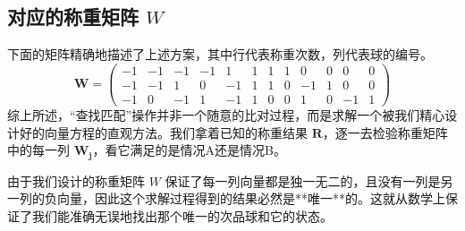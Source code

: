 \documentclass[12pt, a4paper]{ctexart}
\begin{document}
\subsection*{对应的称重矩阵 $W$}
下面的矩阵精确地描述了上述方案，其中行代表称重次数，列代表球的编号。
$$
\mathbf{W} =
\begin{pmatrix}
   -1 & -1 & -1 & -1 &  1 &  1 &  1 &  1 &  0 &  0 &  0 &  0 \\ %
   -1 & -1 &  1 &  0 & -1 &  1 &  1 &  0 & -1 &  1 &  0 &  0 \\ %
   -1 &  0 & -1 &  1 & -1 &  1 &  0 &  0 &  1 &  0 & -1 &  1    %
\end{pmatrix}
$$
综上所述，“查找匹配”操作并非一个随意的比对过程，而是求解一个被我们精心设计好的向量方程的直观方法。我们拿着已知的称重结果 $\mathbf{R}$，逐一去检验称重矩阵中的每一列 $\mathbf{W_j}$，看它满足的是情况A还是情况B。

由于我们设计的称重矩阵 $W$ 保证了每一列向量都是独一无二的，且没有一列是另一列的负向量，因此这个求解过程得到的结果必然是**唯一**的。这就从数学上保证了我们能准确无误地找出那个唯一的次品球和它的状态。
\end{document}

